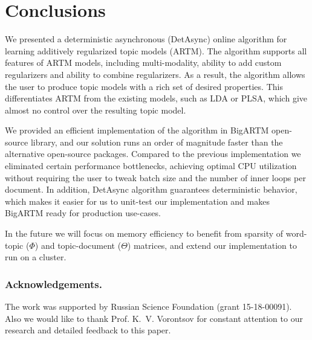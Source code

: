 \documentclass[russian,english]{llncs}
\newcommand{\kw}[1]{\mbox{\textsf{#1}}}
\begin{document}
\section{Conclusions}
\label{sec:Conclusions}

We presented a deterministic asynchronous (\kw{DetAsync}) online algorithm for learning
additively regularized topic models (ARTM).
The algorithm supports all features of ARTM models,
including multi-modality, ability to add custom regularizers and
ability to combine regularizers.
As a result, the algorithm allows the user to produce topic models with a rich set of desired properties.
This differentiates ARTM from the existing models, such as LDA or PLSA,
which give almost no control over the resulting topic model.

We provided an efficient implementation of the algorithm in BigARTM open-source library,
and our solution runs an order of magnitude faster than
the alternative open-source packages.
Compared to the previous implementation we
eliminated certain performance bottlenecks,
achieving optimal CPU utilization without requiring the user
to tweak batch size and the number of inner loops per document.
In addition, \kw{DetAsync} algorithm guarantees deterministic behavior,
which makes it easier for us to unit-test our implementation
and makes BigARTM ready for production use-cases.

In the future we will focus on memory efficiency
to benefit from sparsity of word-topic ($\Phi$) and topic-document ($\Theta$) matrices,
and extend our implementation to run on a cluster.

\bigskip
\subsubsection*{Acknowledgements.}
\nopagebreak
The work was supported by Russian Science Foundation (grant 15-18-00091).
Also we would like to thank Prof. K.~V. Vorontsov for constant attention to our research
and detailed feedback to this paper.

%
%
\end{document}
